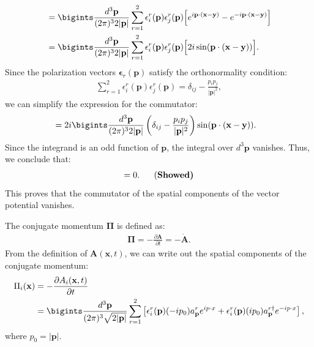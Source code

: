 \begin{enumerate}
\begin{align}
    [A_i(\mathbf{x}), A_j(\mathbf{y})] &= \bigints\frac{d^3 \mathbf{p}}{(2\pi)^3 2|\mathbf{p}|} \sum_{r=1}^2 \epsilon_i^r(\mathbf{p}) \epsilon_j^r(\mathbf{p}) \Big[ e^{i \mathbf{p} \cdot (\mathbf{x} - \mathbf{y})} - e^{-i \mathbf{p} \cdot (\mathbf{x} - \mathbf{y})} \Big] \nonumber \\
    &= \bigints\frac{d^3 \mathbf{p}}{(2\pi)^3 2|\mathbf{p}|} \sum_{r=1}^2 \epsilon_i^r(\mathbf{p}) \epsilon_j^r(\mathbf{p}) \Big[ 2i \sin(\mathbf{p} \cdot (\mathbf{x} - \mathbf{y})) \Big]. 
\end{align}
Since the polarization vectors $\boldsymbol{\epsilon}_r(\mathbf{p})$ satisfy the orthonormality condition:
\begin{align}
    \sum_{r=1}^2 \epsilon_i^r(\mathbf{p}) \epsilon_j^r(\mathbf{p}) = \delta_{ij} - \frac{p_i p_j}{|\mathbf{p}|^2},
\end{align}
we can simplify the expression for the commutator:
\begin{align}
    [A_i(\mathbf{x}), A_j(\mathbf{y})] &= 2i \bigints\frac{d^3 \mathbf{p}}{(2\pi)^3 2|\mathbf{p}|} \left( \delta_{ij} - \frac{p_i p_j}{|\mathbf{p}|^2} \right) \sin(\mathbf{p} \cdot (\mathbf{x} - \mathbf{y})). 
\end{align}
Since the integrand is an odd function of $\mathbf{p}$, the integral over $d^3 \mathbf{p}$ vanishes. Thus, we conclude that:
\begin{align}
    [A_i(\mathbf{x}), A_j(\mathbf{y})] = 0. \label{eq:[A_i,A_j]-check}~~~~~\text{(\bf Showed)}
\end{align}
This proves that the commutator of the spatial components of the vector potential vanishes.

The conjugate momentum $\boldsymbol{\Pi}$ is defined as:
\begin{align*}
    \boldsymbol{\Pi} = -\frac{\partial \mathbf{A}}{\partial t} = -\dot{\mathbf{A}}. 
\end{align*}
From the definition of $\mathbf{A}(\mathbf{x}, t)$, we can write out the spatial components of the conjugate momentum:
\begin{align}
    \Pi_i(\mathbf{x}) &= -\frac{\partial A_i(\mathbf{x}, t)}{\partial t} \nonumber \\
    &= \bigints\frac{d^3 \mathbf{p}}{(2\pi)^3 \sqrt{2|\mathbf{p}|}} \sum_{r=1}^2 \left[ \epsilon_i^r(\mathbf{p}) (-i p_0) a^r_{\mathbf{p}} e^{i p \cdot x} + \epsilon_i^r(\mathbf{p}) (i p_0) a^{r\dagger}_{\mathbf{p}} e^{-i p \cdot x} \right],
\end{align}
where $p_0 = |\mathbf{p}|$.


\end{enumerate}
